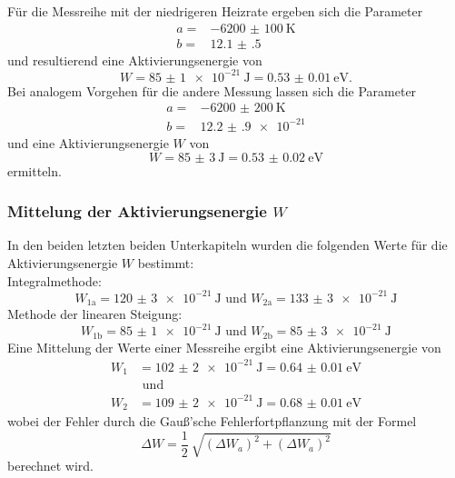 Für die Messreihe mit der niedrigeren Heizrate ergeben sich die Parameter
\begin{align*}
  a =& \SI{-6200(100)}{\kelvin} \\
  b =& \num{12.1(5)}
\end{align*}
und resultierend eine Aktivierungsenergie von
\begin{equation*}
  W = \SI{85(1)e-21}{\joule} = \SI{0.53(1)}{\electronvolt}.
\end{equation*}
Bei analogem Vorgehen für die andere Messung lassen sich die Parameter
\begin{align*}
  a =& \SI{-6200(200)}{\kelvin} \\
  b =& \num{12.2(9)e-21}
\end{align*}
und eine Aktivierungsenergie $W$ von
\begin{equation*}
  W = \SI{85(3)}{\joule} = \SI{0.53(2)}{\electronvolt}
\end{equation*}
ermitteln.
\subsubsection{Mittelung der Aktivierungsenergie $W$}
In den beiden letzten beiden Unterkapiteln wurden die folgenden Werte für die
Aktivierungsenergie $W$ bestimmt: \\
Integralmethode:
\begin{equation*}
  W_\text{1a} = \SI{120(3)e-21}{\joule} \text{ und } W_\text{2a} =
  \SI{133(3)e-21}{\joule}
\end{equation*}
Methode der linearen Steigung:
\begin{equation*}
  W_\text{1b} = \SI{85(1)e-21}{\joule} \text{ und } W_\text{2b} =
  \SI{85(3)e-21}{\joule}
\end{equation*}
Eine Mittelung der Werte einer Messreihe ergibt eine Aktivierungsenergie von
\begin{align*}
  W_1 &= \SI{102(2)e-21}{\joule} = \SI{0.64(1)}{\electronvolt}\\
  & \text{ und } \\
  W_2 &= \SI{109(2)e-21}{\joule} = \SI{0.68(1)}{\electronvolt}
\end{align*}
wobei der Fehler durch die Gauß'sche Fehlerfortpflanzung mit der Formel
\begin{equation}
  \Delta W = \frac{1}{2} \: \sqrt{(\Delta W_a)^2 + (\Delta W_a)^2}
\end{equation}
berechnet wird.
